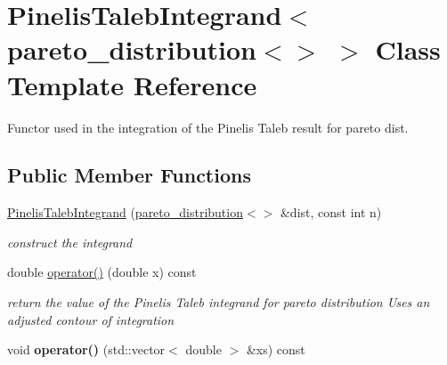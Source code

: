 \hypertarget{classPinelisTalebIntegrand_3_01pareto__distribution_3_4_01_4}{}\section{Pinelis\+Taleb\+Integrand$<$ pareto\+\_\+distribution$<$$>$ $>$ Class Template Reference}
\label{classPinelisTalebIntegrand_3_01pareto__distribution_3_4_01_4}


Functor used in the integration of the Pinelis Taleb result for pareto dist.  


\subsection*{Public Member Functions}
\begin{DoxyCompactItemize}
\item 
\mbox{\hyperlink{classPinelisTalebIntegrand_3_01pareto__distribution_3_4_01_4_a518cd7558e51a20773b82d71b5eaa817}{Pinelis\+Taleb\+Integrand}} (\mbox{\hyperlink{classpareto__distribution}{pareto\+\_\+distribution}}$<$$>$ \&dist, const int n)
\begin{DoxyCompactList}\small\item\em construct the integrand \end{DoxyCompactList}\item 
\mbox{\label{classPinelisTalebIntegrand_3_01pareto__distribution_3_4_01_4_ae542b541e99e72c6e22c1a69cbc4abfa}} 
double \mbox{\hyperlink{classPinelisTalebIntegrand_3_01pareto__distribution_3_4_01_4_ae542b541e99e72c6e22c1a69cbc4abfa}{operator()}} (double x) const
\begin{DoxyCompactList}\small\item\em return the value of the Pinelis Taleb integrand for pareto distribution Uses an adjusted contour of integration \end{DoxyCompactList}\item 
\mbox{\label{classPinelisTalebIntegrand_3_01pareto__distribution_3_4_01_4_a103c4b234553d169a2ee69f7e6ba5804}} 
void {\bfseries operator()} (std\+::vector$<$ double $>$ \&xs) const
\end{DoxyCompactItemize}



